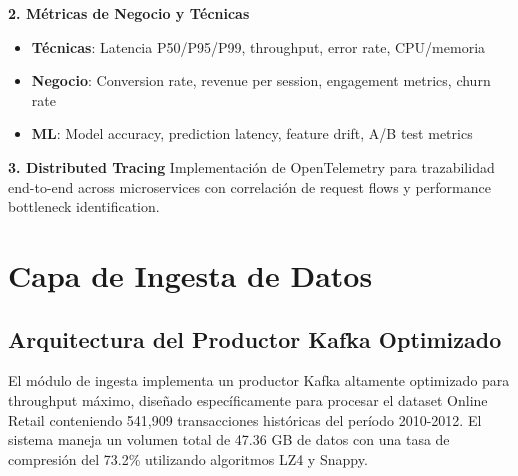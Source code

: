 \vspace{0.2cm}

\textbf{2. Métricas de Negocio y Técnicas}
\begin{itemize}[leftmargin=*, itemsep=0.1cm]
\item \textbf{Técnicas}: Latencia P50/P95/P99, throughput, error rate, CPU/memoria
\item \textbf{Negocio}: Conversion rate, revenue per session, engagement metrics, churn rate
\item \textbf{ML}: Model accuracy, prediction latency, feature drift, A/B test metrics
\end{itemize}

\textbf{3. Distributed Tracing}
Implementación de OpenTelemetry para trazabilidad end-to-end across microservices con correlación de request flows y performance bottleneck identification.

\section{Capa de Ingesta de Datos}
\label{sec:ingesta}

\subsection{Arquitectura del Productor Kafka Optimizado}
\label{subsec:arquitectura_productor}

El módulo de ingesta implementa un productor Kafka altamente optimizado para throughput máximo, diseñado específicamente para procesar el dataset Online Retail conteniendo 541,909 transacciones históricas del período 2010-2012. El sistema maneja un volumen total de 47.36 GB de datos con una tasa de compresión del 73.2\% utilizando algoritmos LZ4 y Snappy.

\vspace{0.3cm}

